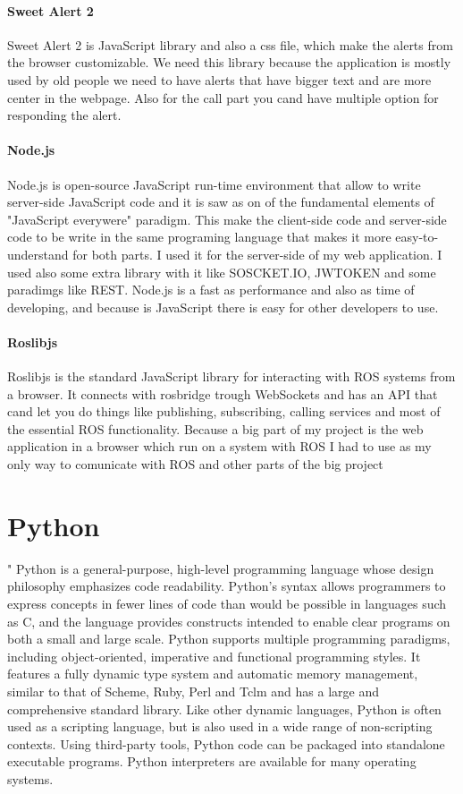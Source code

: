 \paragraph{Sweet Alert 2}
Sweet Alert 2 is JavaScript library and also a css file, which make the alerts from
the browser customizable. We need this library because the application is mostly
used by old people we need to have alerts that have bigger text and are more center
in the webpage. Also for the call part you cand have multiple option for responding
the alert.


\paragraph{Node.js}
Node.js is open-source JavaScript run-time environment that allow to write server-side
JavaScript code and it is saw as on of the fundamental elements of "JavaScript everywere"
paradigm. This make the client-side code and server-side code to be write in the same
programing language that makes it more easy-to-understand for both parts. I used it
for the server-side of my web application. I used also some extra library with it like
SOSCKET.IO, JWTOKEN and some paradimgs like REST. Node.js is a fast as performance and
also as time of developing, and because is JavaScript there is easy for other developers
to use.


\paragraph{Roslibjs}
Roslibjs is the standard JavaScript library for interacting with ROS systems from
a browser. It connects with rosbridge trough WebSockets and has an API that cand let
you do things like publishing, subscribing, calling services and most of the essential ROS
functionality. Because a big part of my project is the web application in a browser which 
run on a system with ROS I had to use as my only way to comunicate with ROS and other parts
of the big project

\section{Python}
\label{sec:python}
"
Python is a general-purpose, high-level programming language whose design philosophy emphasizes code readability.
Python's syntax allows programmers to express concepts in fewer lines of code than would be possible in languages
such as C, and the language provides constructs intended to enable clear programs on both a small and large
scale.
Python supports multiple programming paradigms, including object-oriented, imperative and functional programming
styles. It features a fully dynamic type system and automatic memory management, similar to that of Scheme, Ruby,
Perl and Tclm and has a large and comprehensive standard library.
Like other dynamic languages, Python is often used as a scripting language, but is also used in a wide range of
non-scripting contexts. Using third-party tools, Python code can be packaged into standalone executable programs.
Python interpreters are available for many operating systems.

